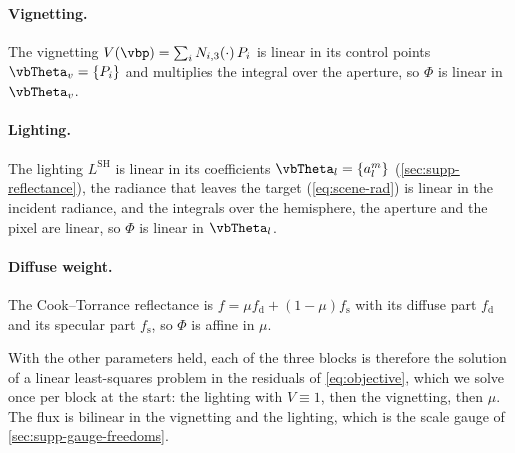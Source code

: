 \paragraph{Vignetting.} The vignetting
$V(\vbp)=\sum_{i} N_{i,3}(\cdot)\,P_i$ is linear in its control points
$\vbTheta_v=\{P_i\}$ and multiplies the integral over the aperture,
so $\Phi$ is linear in $\vbTheta_v$.

\paragraph{Lighting.} The lighting $L^{\text{SH}}$ is linear in its
coefficients $\vbTheta_l=\{a_l^m\}$
(\cref{sec:supp-reflectance}), the radiance that leaves the target
(\cref{eq:scene-rad}) is linear in the incident radiance, and the
integrals over the hemisphere, the aperture and the pixel are linear,
so $\Phi$ is linear in $\vbTheta_l$.

\paragraph{Diffuse weight.} The Cook--Torrance reflectance is
$f=\mu f_{\text{d}}+(1-\mu)f_{\text{s}}$ with its diffuse part
$f_{\text{d}}$ and its specular part $f_{\text{s}}$, so $\Phi$ is
affine in $\mu$.

With the other parameters held, each of the three blocks is therefore
the solution of a linear least-squares problem in the residuals of
\cref{eq:objective}, which we solve once per block at the start: the
lighting with $V\equiv1$, then the vignetting, then $\mu$. The flux
is bilinear in the vignetting and the lighting, which is the scale
gauge of \cref{sec:supp-gauge-freedoms}.



